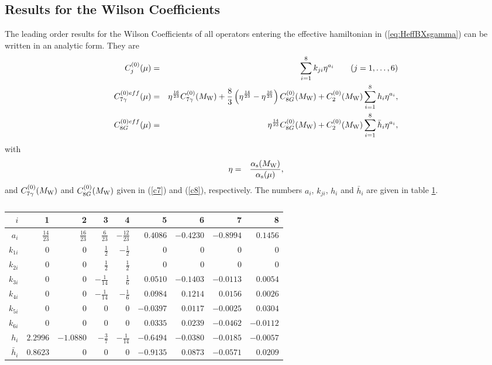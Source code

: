 \subsection{Results for the Wilson Coefficients}
         \label{sec:Heff:BXsgamma:wcres}
The leading order results for the Wilson Coefficients of all operators
entering the effective hamiltonian in (\ref{eq:HeffBXsgamma}) can be written
in an analytic form. They are \cite{BMMP:94}
\begin{eqnarray}
\label{coeffs}
C_j^{(0)}(\mu)    & = & \sum_{i=1}^8 k_{ji} \eta^{a_i}
  \qquad (j=1,\ldots,6)  \\
\label{C7eff}
C_{7\gamma}^{(0)eff}(\mu) & = & 
\eta^\frac{16}{23} C_{7\gamma}^{(0)}(M_{\rm W}) + \frac{8}{3}
   \left(\eta^\frac{14}{23} - \eta^\frac{16}{23}\right) C_{8G}^{(0)}(M_{\rm W}) +
    C_2^{(0)}(M_{\rm W})\sum_{i=1}^8 h_i \eta^{a_i},
\label{C7Geff}
\\
C_{8G}^{(0)eff}(\mu) & = & 
\eta^\frac{14}{23} C_{8G}^{(0)}(M_{\rm W}) 
   + C_2^{(0)}(M_{\rm W}) \sum_{i=1}^8 \bar h_i \eta^{a_i},
\end{eqnarray}
with
\begin{eqnarray}
\eta & = & \frac{\alpha_{\rm s}(M_{\rm W})}{\alpha_{\rm s}(\mu)}, 
\end{eqnarray}
and $C_{7\gamma}^{(0)}(M_{\rm W})$
and $ C_{8G}^{(0)}(M_{\rm W})$ given in (\ref{c7}) and (\ref{c8}),
respectively. The numbers $a_i$, $k_{ji}$, $h_i$ and $\bar h_i$ are
given in table \ref{tab:akh}.

\begin{table}[htb]
\caption[]{
\label{tab:akh}}
\begin{center}
\begin{tabular}{|r|r|r|r|r|r|r|r|r|}
$i$ & 1 & 2 & 3 & 4 & 5 & 6 & 7 & 8 \\
\hline
$a_i $&$ \frac{14}{23} $&$ \frac{16}{23} $&$ \frac{6}{23} $&$
-\frac{12}{23} $&$
0.4086 $&$ -0.4230 $&$ -0.8994 $&$ 0.1456 $\\
$k_{1i} $&$ 0 $&$ 0 $&$ \frac{1}{2} $&$ - \frac{1}{2} $&$
0 $&$ 0 $&$ 0 $&$ 0 $\\
$k_{2i} $&$ 0 $&$ 0 $&$ \frac{1}{2} $&$  \frac{1}{2} $&$
0 $&$ 0 $&$ 0 $&$ 0 $\\
$k_{3i} $&$ 0 $&$ 0 $&$ - \frac{1}{14} $&$  \frac{1}{6} $&$
0.0510 $&$ - 0.1403 $&$ - 0.0113 $&$ 0.0054 $\\
$k_{4i} $&$ 0 $&$ 0 $&$ - \frac{1}{14} $&$  - \frac{1}{6} $&$
0.0984 $&$ 0.1214 $&$ 0.0156 $&$ 0.0026 $\\
$k_{5i} $&$ 0 $&$ 0 $&$ 0 $&$  0 $&$
- 0.0397 $&$ 0.0117 $&$ - 0.0025 $&$ 0.0304 $\\
$k_{6i} $&$ 0 $&$ 0 $&$ 0 $&$  0 $&$
0.0335 $&$ 0.0239 $&$ - 0.0462 $&$ -0.0112 $\\
$h_i $&$ 2.2996 $&$ - 1.0880 $&$ - \frac{3}{7} $&$ -
\frac{1}{14} $&$ -0.6494 $&$ -0.0380 $&$ -0.0185 $&$ -0.0057 $\\
$\bar h_i $&$ 0.8623 $&$ 0 $&$ 0 $&$ 0
 $&$ -0.9135 $&$ 0.0873 $&$ -0.0571 $&$ 0.0209 $\\
\end{tabular}
\end{center}
\end{table}

